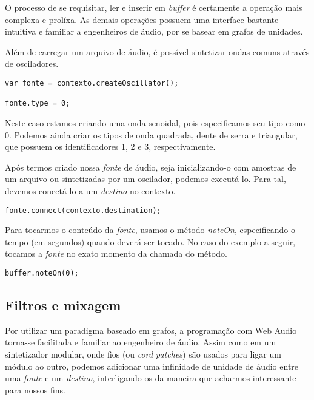 \documentclass
  [ams,pdfout]%
        {aesbr}
\begin{document}
O processo de se requisitar, ler e inserir em \emph{buffer} é
certamente a operação mais complexa e prolíxa. As demais operações
possuem uma interface bastante intuitiva e familiar a engenheiros de
áudio, por se basear em grafos de unidades.

Além de carregar um arquivo de áudio, é possível sintetizar ondas
comuns através de osciladores.

\begingroup
    \fontsize{8pt}{9pt}\selectfont
\begin{verbatim}
var fonte = contexto.createOscillator();

fonte.type = 0;
\end{verbatim}
\endgroup

Neste caso estamos criando uma onda senoidal, pois especificamos seu
tipo como $0$. Podemos ainda criar os tipos de onda quadrada, dente de
serra e triangular, que possuem os identificadores 1, 2 e 3,
respectivamente.

Após termos criado nossa \emph{fonte} de áudio, seja inicializando-o
com amostras de um arquivo ou sintetizadas por um oscilador, podemos
executá-lo. Para tal, devemos conectá-lo a um \emph{destino} no
contexto.

\begingroup
    \fontsize{8pt}{9pt}\selectfont
\begin{verbatim}
fonte.connect(contexto.destination);
\end{verbatim}
\endgroup

Para tocarmos o conteúdo da \emph{fonte}, usamos o método
\emph{noteOn}, especificando o tempo (em segundos) quando deverá ser
tocado. No caso do exemplo a seguir, tocamos a \emph{fonte} no exato
momento da chamada do método.

\begingroup
    \fontsize{8pt}{9pt}\selectfont
\begin{verbatim}
buffer.noteOn(0);
\end{verbatim}
\endgroup

\subsection{Filtros e mixagem}

Por utilizar um paradigma baseado em grafos, a programação com Web
Audio torna-se facilitada e familiar ao engenheiro de áudio. Assim
como em um sintetizador modular, onde fios (ou \emph{cord patches})
são usados para ligar um módulo ao outro, podemos adicionar uma
infinidade de unidade de áudio entre uma \emph{fonte} e um
\emph{destino}, interligando-os da maneira que acharmos interessante
para nossos fins.
\end{document}
